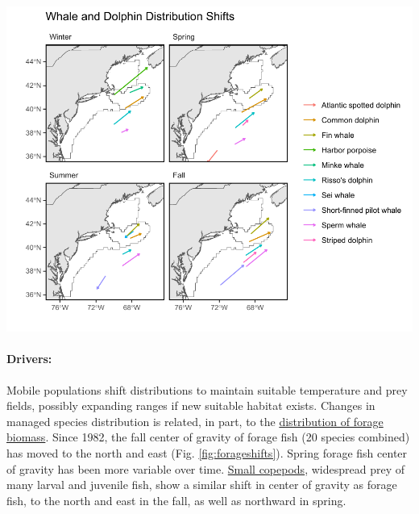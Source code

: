 \documentclass[
  10pt,
]{article}
\let\origfigure\figure
\let\endorigfigure\endfigure
\renewenvironment{figure}[1][2] {
    \expandafter\origfigure\expandafter[H]
} {
    \endorigfigure
}
\begin{document}
\begin{figure}

{\centering \includegraphics{midatlantic_files/figure-latex/protectedspp-dist-shifts-1} 

}

\caption{Direction and magnitude of core habitat shifts, represented by the length of the line of the seasonal weighted centroid for species with more than 70 km difference between 2010 and 2017 (tip of arrow).}\label{fig:protectedspp-dist-shifts}
\end{figure}

\paragraph{Drivers:}\label{drivers}

Mobile populations shift distributions to maintain suitable temperature and prey fields, possibly expanding ranges if new suitable habitat exists. Changes in managed species distribution is related, in part, to the \href{https://noaa-edab.github.io/catalog/forage_index.html}{distribution of forage biomass}. Since 1982, the fall center of gravity of forage fish (20 species combined) has moved to the north and east (Fig. \ref{fig:forageshifts}). Spring forage fish center of gravity has been more variable over time. \href{https://noaa-edab.github.io/catalog/zooplankton_index.html\#key-results-and-visualizations-4}{Small copepods}, widespread prey of many larval and juvenile fish, show a similar shift in center of gravity as forage fish, to the north and east in the fall, as well as northward in spring.
\end{document}
